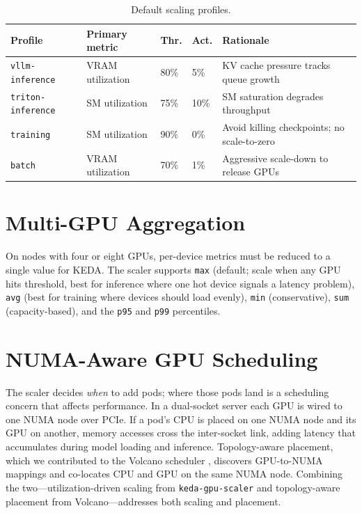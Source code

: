 \documentclass[11pt]{article}
\begin{document}
\begin{table}[h]
\centering
\begin{tabular}{L{0.20\textwidth} L{0.20\textwidth} l l L{0.26\textwidth}}
\toprule
\textbf{Profile} & \textbf{Primary metric} & \textbf{Thr.} & \textbf{Act.} & \textbf{Rationale} \\
\midrule
\texttt{vllm-inference} & VRAM utilization & 80\% & 5\% & KV cache pressure tracks queue growth \\
\texttt{triton-inference} & SM utilization & 75\% & 10\% & SM saturation degrades throughput \\
\texttt{training} & SM utilization & 90\% & 0\% & Avoid killing checkpoints; no scale-to-zero \\
\texttt{batch} & VRAM utilization & 70\% & 1\% & Aggressive scale-down to release GPUs \\
\bottomrule
\end{tabular}
\caption{Default scaling profiles.}
\label{tab:profiles}
\end{table}

\section{Multi-GPU Aggregation}

On nodes with four or eight GPUs, per-device metrics must be reduced to a single
value for KEDA. The scaler supports \texttt{max} (default; scale when any GPU
hits threshold, best for inference where one hot device signals a latency
problem), \texttt{avg} (best for training where devices should load evenly),
\texttt{min} (conservative), \texttt{sum} (capacity-based), and the \texttt{p95}
and \texttt{p99} percentiles.

\section{NUMA-Aware GPU Scheduling}

The scaler decides \emph{when} to add pods; where those pods land is a scheduling
concern that affects performance. In a dual-socket server each GPU is wired to one
NUMA node over PCIe. If a pod's CPU is placed on one NUMA node and its GPU on
another, memory accesses cross the inter-socket link, adding latency that
accumulates during model loading and inference. Topology-aware placement, which
we contributed to the Volcano scheduler \cite{volcano,volcanopr}, discovers
GPU-to-NUMA mappings and co-locates CPU and GPU on the same NUMA node. Combining
the two---utilization-driven scaling from \texttt{keda-gpu-scaler} and
topology-aware placement from Volcano---addresses both scaling and placement.
\end{document}
